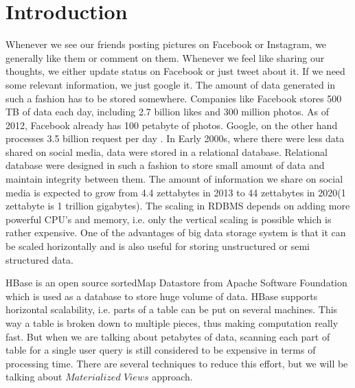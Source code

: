 \documentclass[11pt,a4paper,bibtotoc,idxtotoc,headsepline,footsepline,footexclude,BCOR12mm,DIV13]{scrbook}
\begin{document}
	\frontmatter
	
	
	
	
	
	
%	
	\clearemptydoublepage
	
	
	
	
	
	
	
	
	

	\tableofcontents
  

	\mainmatter
	
	



\chapter{Introduction}
\label{chap:introduction}

Whenever we see our friends posting pictures on Facebook or Instagram, we generally like them or comment on them. Whenever we feel like sharing our thoughts, we either update status on Facebook or just tweet about it. If we need some relevant information, we just google it. The amount of data generated in such a fashion has to be stored somewhere. Companies like Facebook stores 500 TB of data each day\cite{daniel:datastats}, including 2.7 billion likes and 300 million photos. As of 2012, Facebook already has 100 petabyte of photos\cite{daniel:datastats}. Google, on the other hand processes 3.5 billion request per day \cite{daniel:datastats}. In Early 2000s, where there were less data shared on social media, data were stored in a relational database. Relational database were designed in such a fashion to store small amount of data and maintain integrity between them\cite{matt:rdb}. The amount of information we share on social media is expected to grow from 4.4 zettabytes in 2013 to 44 zettabytes in 2020(1 zettabyte is 1 trillion gigabytes)\cite{matt:rdb}. The scaling in RDBMS depends on adding more powerful CPU's and memory, i.e. only the vertical scaling is possible which is rather expensive.  One of the advantages of big data storage system is that it can be scaled horizontally and is also useful for storing unstructured or semi structured data. 

HBase is an open source sortedMap Datastore from Apache Software Foundation which is used as a database to store huge volume of data. HBase supports horizontal scalability, i.e. parts of a table can be put on several machines. This way a table is broken down to multiple pieces, thus making computation really fast. But when we are talking about petabytes of data, scanning each part of table for a single user query is still considered to be expensive in terms of processing time. There are several techniques to reduce this effort, but we will be talking about $Materialized$ $Views$ approach. 
\end{document}
